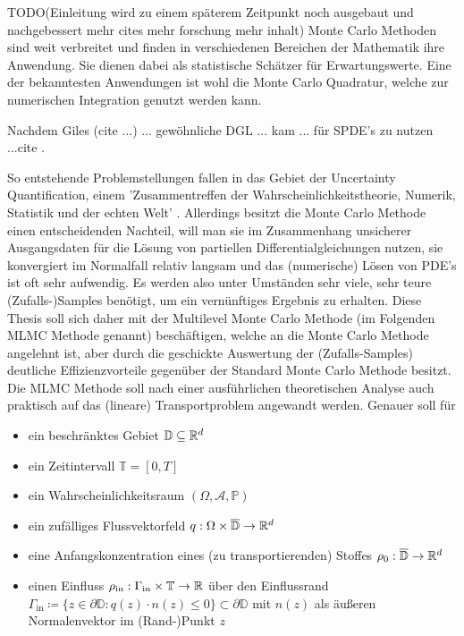 
TODO(Einleitung wird zu einem späterem Zeitpunkt noch ausgebaut und nachgebessert mehr cites mehr forschung mehr inhalt)
Monte Carlo Methoden sind weit verbreitet und finden in verschiedenen Bereichen der Mathematik ihre Anwendung.
Sie dienen dabei als statistische Schätzer für Erwartungswerte. 
Eine der bekanntesten Anwendungen ist wohl die Monte Carlo Quadratur, welche zur numerischen Integration genutzt werden kann.
 
Nachdem Giles (cite ...) ... gewöhnliche DGL ... kam ... für SPDE's zu nutzen ...cite .

So entstehende Problemstellungen fallen in das Gebiet der Uncertainty Quantification, einem 'Zusammentreffen der Wahrscheinlichkeitstheorie, Numerik, Statistik und der echten Welt' \cite{sullivan2015introduction}.
Allerdings besitzt die Monte Carlo Methode einen entscheidenden Nachteil, will man sie im Zusammenhang unsicherer Ausgangsdaten für die Lösung von partiellen Differentialgleichungen nutzen, sie konvergiert im Normalfall relativ langsam und das (numerische) Lösen von PDE's ist oft sehr aufwendig.
Es werden also unter Umständen sehr viele, sehr teure (Zufalls-)Samples benötigt, um ein vernünftiges Ergebnis zu erhalten. \newline
Diese Thesis soll sich daher mit der Multilevel Monte Carlo Methode (im Folgenden MLMC Methode genannt) beschäftigen, welche an die Monte Carlo Methode angelehnt ist, aber durch die geschickte Auswertung der (Zufalls-Samples) deutliche Effizienzvorteile gegenüber der Standard Monte Carlo Methode besitzt.
Die MLMC Methode soll nach einer ausführlichen theoretischen Analyse auch praktisch auf das (lineare) Transportproblem angewandt werden.
Genauer soll für
\begin{itemize}
	\item ein beschränktes Gebiet $\mathbb{D} \subseteq \mathbb{R}^d$
	\item  ein Zeitintervall $\mathbb{T} = [0,T]$
	\item  ein Wahrscheinlichkeitsraum $(\Omega,\mathcal{A},\mathbb{P})$
	\item  ein zufälliges Flussvektorfeld $q: \Omega \times \overline{\mathbb{D}} \rightarrow \mathbb{R}^d$
	\item  eine Anfangskonzentration eines (zu transportierenden) Stoffes $\rho_0: \overline{\mathbb{D}} \rightarrow \mathbb{R}^d$
	\item einen Einfluss $\rho_{\text{in}} : \Gamma_{\text{in}} \times \mathbb{T} \rightarrow \mathbb{R}$ über den Einflussrand $\Gamma_{\text{in}} \coloneqq  \{ z \in \partial \mathbb{D}: q(z)\cdot n(z) \leq 0 \} \subset  \partial \mathbb{D}$ mit $n(z)$ als äußeren Normalenvektor im (Rand-)Punkt $z$
\end{itemize}
